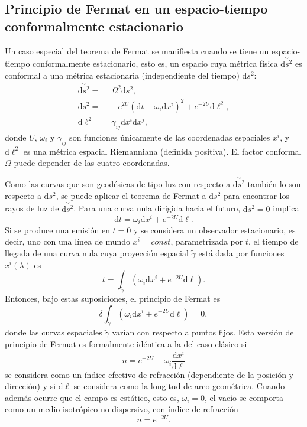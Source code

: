 \subsection{Principio de Fermat en un espacio-tiempo conformalmente estacionario}
Un caso especial del teorema de Fermat se manifiesta cuando se tiene un espacio-tiempo conformalmente estacionario, esto es, un espacio cuya métrica física $\overset{\sim}{\mathrm{d}s^2}$ es conformal a una métrica estacionaria (independiente del tiempo) $\mathrm{d}s^2$:
\begin{align}
\overset{\sim}{\mathrm{d}s^2} =& \Omega^2 \mathrm{d}s^2,\\
\mathrm{d}s^2 =& -e^{2U}(\mathrm{d}t-\omega_i\mathrm{d}x^i)^2+e^{-2U}\mathrm{d}\ell^2,\\
\mathrm{d}\ell^2 =& \gamma_{ij} \mathrm{d}x^i\mathrm{d}x^j,
\end{align}
donde $U$, $\omega_i$ y $\gamma_{ij}$ son funciones únicamente de las coordenadas espaciales $x^i$, y $\mathrm{d}\ell^2$ es una métrica espacial Riemanniana (definida positiva). El factor conformal $\Omega$ puede depender de las cuatro coordenadas.

Como las curvas que son geodésicas de tipo luz con respecto a $\overset{\sim}{\mathrm{d}s^2}$ también lo son respecto a $\mathrm{d}s^2$, se puede aplicar el teorema de Fermat a $\mathrm{d}s^2$ para encontrar los rayos de luz de $\overset{\sim}{\mathrm{d}s^2}$. Para una curva nula dirigida hacia el futuro, $\mathrm{d}s^2=0$ implica
\begin{equation}
\mathrm{d}t=\omega_i\mathrm{d}x^i+e^{-2U}\mathrm{d}\ell.
\end{equation}
Si se produce una emisión en $t=0$ y se considera un observador estacionario, es decir, uno con una línea de mundo $x^i=const$, parametrizada por $t$, el tiempo de llegada de una curva nula cuya proyección espacial $\tilde{\gamma}$ está dada por funciones $x^i(\lambda)$ es
\begin{equation}
	t=\int_{\tilde{\gamma}} (\omega_i\mathrm{d}x^i+e^{-2U}\mathrm{d\ell}).
\end{equation}
Entonces, bajo estas suposiciones, el principio de Fermat es
\begin{equation}
\delta \int_{\tilde{\gamma}} (\omega_i\mathrm{d}x^i+e^{-2U}\mathrm{d\ell})=0,
\end{equation}
donde las curvas espaciales $\tilde{\gamma}$ varían con respecto a puntos fijos. Esta versión del principio de Fermat es formalmente idéntica a la del caso clásico si \cite{schneider_ehlers_falco_1992}
\begin{equation}
n=e^{-2U}+\omega_i\frac{\mathrm{d}x^i}{\mathrm{d}\ell}
\end{equation}
se considera como un índice efectivo de refracción (dependiente de la posición y dirección) y si $\mathrm{d}\ell$ se considera como la longitud de arco geométrica. Cuando además ocurre que el campo es estático, esto es, $\omega_i=0$, el vacío se comporta como un medio isotrópico no dispersivo, con índice de refracción
\begin{equation}
	n=e^{-2U}.
\end{equation} 

